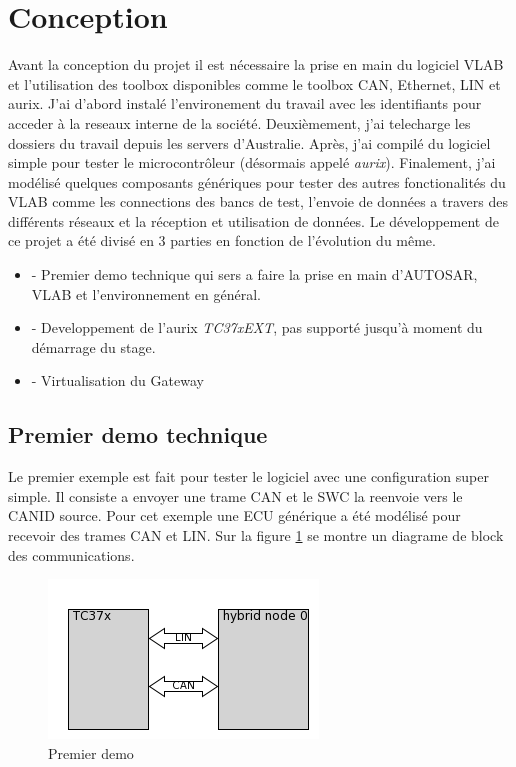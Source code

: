 \section{Conception}

Avant la conception du projet il est nécessaire la prise en main du logiciel VLAB et l'utilisation des toolbox disponibles comme le toolbox CAN, Ethernet, LIN et aurix. J'ai d'abord instal\'e l'environement du travail avec les identifiants pour acceder \`a la reseaux interne de la soci\'et\'e. Deuxièmement, j'ai telecharge les dossiers du travail depuis les servers d'Australie. Apr\`es, j'ai compil\'e du logiciel simple pour tester le microcontr\^oleur (désormais appel\'e \textit{aurix}). Finalement, j'ai mod\'elis\'e quelques composants génériques pour tester des autres fonctionalit\'es du VLAB comme les connections des bancs de test, l'envoie de donn\'ees a travers des différents réseaux et la réception et utilisation de donn\'ees. Le développement de ce projet a \'et\'e divis\'e en 3 parties en fonction de l'évolution du même.

\begin{itemize}
    \item - Premier demo technique qui sers a faire la prise en main d'AUTOSAR, VLAB et l'environnement en général.
    \item - Developpement de l'aurix \textit{TC37xEXT}\cite{aurix.tc37e}, pas support\'e jusqu'\`a moment du démarrage du stage.
    \item - Virtualisation du Gateway
\end{itemize}

\subsection{Premier demo technique}

Le premier exemple est fait pour tester le logiciel avec une configuration super simple. Il consiste a envoyer une trame CAN et le SWC la reenvoie vers le CANID source. Pour cet exemple une ECU générique a \'et\'e modélisé pour recevoir des trames CAN et LIN. Sur la figure \ref{fig:first-demo-diagram} se montre un diagrame de block des communications. 

\begin{figure}[!htb]
 \centering
 \includegraphics[]{img/first_demo_testbench.png}
 \caption{Premier demo}
 \label{fig:first-demo-diagram}
\end{figure}


